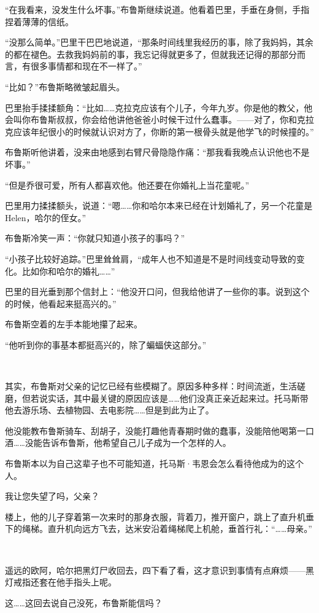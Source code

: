 \documentclass[../main]{subfiles}
\begin{document}
“在我看来，没发生什么坏事。”布鲁斯继续说道。他看着巴里，手垂在身侧，手指捏着薄薄的信纸。

“没那么简单。”巴里干巴巴地说道，“那条时间线里我经历的事，除了我妈妈，其余的都在褪色。去救我妈妈前的事，我忘记得就更多了，但就我还记得的那部分而言，有很多事情都和现在不一样了。”

“比如？”布鲁斯略微皱起眉头。

巴里抬手揉揉额角：“比如……克拉克应该有个儿子，今年九岁。你是他的教父，他会叫你布鲁斯叔叔，你会给他讲他爸爸小时候干过什么蠢事。——对了，你和克拉克应该年纪很小的时候就认识对方了，你断的第一根骨头就是他学飞的时候撞的。”

布鲁斯听他讲着，没来由地感到右臂尺骨隐隐作痛：“那我看我晚点认识他也不是坏事。”

“但是乔很可爱，所有人都喜欢他。他还要在你婚礼上当花童呢。”

巴里用力揉揉额头，说道：“嗯……你和哈尔本来已经在计划婚礼了，另一个花童是Helen，哈尔的侄女。”

布鲁斯冷笑一声：“你就只知道小孩子的事吗？”

“小孩子比较好追踪。”巴里耸耸肩，“成年人也不知道是不是时间线变动导致的变化。比如你和哈尔的婚礼……”

巴里的目光垂到那个信封上：“他没开口问，但我给他讲了一些你的事。说到这个的时候，他看起来挺高兴的。”

布鲁斯空着的左手本能地攥了起来。

“他听到你的事基本都挺高兴的，除了蝙蝠侠这部分。”

~\

其实，布鲁斯对父亲的记忆已经有些模糊了。原因多种多样：时间流逝，生活磋磨，但若说实话，其中最关键的原因应该是……他们没真正亲近起来过。托马斯带他去游乐场、去植物园、去电影院……但是到此为止了。

他没能教布鲁斯骑车、刮胡子，没能打趣他青春期时做的蠢事，没能陪他喝第一口酒……没能告诉布鲁斯，他希望自己儿子成为一个怎样的人。

布鲁斯本以为自己这辈子也不可能知道，托马斯·韦恩会怎么看待他成为的这个人。

我让您失望了吗，父亲？

楼上，他的儿子穿着第一次来时的那身衣服，背着刀，推开窗户，跳上了直升机垂下的绳梯。直升机向远方飞去，达米安沿着绳梯爬上机舱，垂首行礼：“……母亲。”

~\

遥远的欧阿，哈尔把黑灯尸收回去，四下看了看，这才意识到事情有点麻烦——黑灯戒指还套在他手指头上呢。

这……这回去说自己没死，布鲁斯能信吗？
\end{document}
